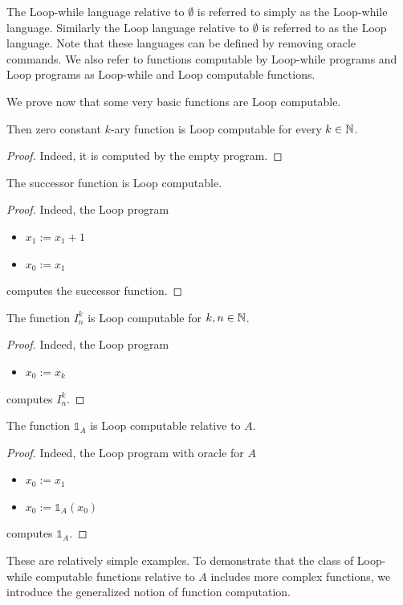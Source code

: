 \documentclass[10pt]{amsart}
\begin{document}
\begin{remark}\label{remark:usual_loop_while_and_loop_are_relative_to_emptyset}
	The Loop-while language relative to $\emptyset$ is referred to simply as the Loop-while language. Similarly the Loop language relative to $\emptyset$ is referred to as the Loop language. Note that these languages can be defined by removing oracle commands. We also refer to functions computable by Loop-while programs and Loop programs as Loop-while and Loop computable functions.
\end{remark}
\noindent
We prove now that some very basic functions are Loop computable.

\begin{fact}\label{fact:zery_constant_function_is_Loop_computable}
	Then zero constant $k$-ary function is Loop computable for every $k \in {\mathbb N}$.
\end{fact}
\begin{proof}
	Indeed, it is computed by the empty program.
\end{proof}

\begin{fact}\label{fact:successor_is_Loop_computable}
	The successor function is Loop computable.
\end{fact}
\begin{proof}
	Indeed, the Loop program
	\begin{itemize}
		\item[] $x_1:= x_1 + 1$
		\item[] $x_0:= x_1$
	\end{itemize}
	computes the successor function.
\end{proof}

\begin{fact}\label{fact:projections_are_Loop_computable}
	The function $I^k_n$ is Loop computable for $k, n\in {\mathbb N}$.
\end{fact}
\begin{proof}
	Indeed, the Loop program
	\begin{itemize}
		\item[] $x_0:=x_k$
	\end{itemize}
	computes $I^k_n$.
\end{proof}

\begin{fact}\label{fact:indicator_of_oracle_set_is_relative_computable}
	The function $\mathbb{1}_A$ is Loop computable relative to $A$.
\end{fact}
\begin{proof}
	Indeed, the Loop program with oracle for $A$
	\begin{itemize}
		\item[] $x_0:=x_1$
		\item[] $x_0:=\mathbb{1}_A(x_0)$
	\end{itemize}
	computes $\mathbb{1}_A$.
\end{proof}
\noindent
These are relatively simple examples. To demonstrate that the class of Loop-while computable functions relative to $A$ includes more complex functions, we introduce the generalized notion of function computation.
\end{document}
